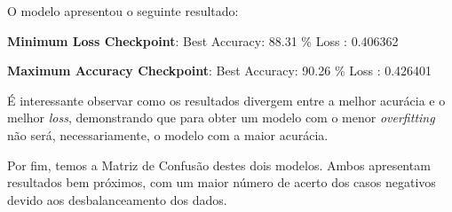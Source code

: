 \documentclass[12pt]{article}
\begin{document}
O modelo apresentou o seguinte resultado:

\begin{center}
	\textbf{Minimum Loss Checkpoint}: 
	\hspace{80px}
	Best Accuracy: 88.31 \% \hfill
	Loss : 0.406362 
	
	\textbf{Maximum Accuracy Checkpoint}: 
	\hspace{48px}
	Best Accuracy: 90.26 \% \hfill
	Loss : 0.426401
\end{center}

É interessante observar como os resultados divergem entre a melhor acurácia e o melhor \textit{loss}, demonstrando que para obter um modelo com o menor \textit{overfitting} não será, necessariamente, o modelo com a maior acurácia.

Por fim, temos a Matriz de Confusão destes dois modelos. Ambos apresentam resultados bem próximos, com um maior número de acerto dos casos negativos devido aos desbalanceamento dos dados.
\end{document}
